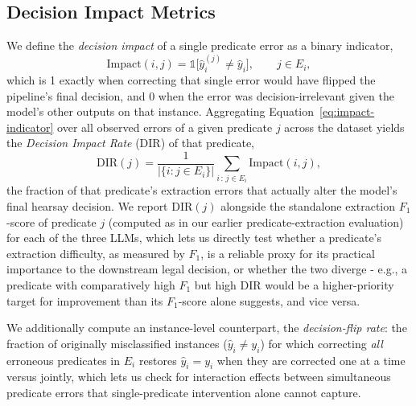 \subsection{Decision Impact Metrics}
\label{subsec:metrics}
We define the \emph{decision impact} of a single predicate error as a binary indicator,
\begin{equation}
\label{eq:impact-indicator}
\mathrm{Impact}(i,j) = \mathbb{1}\big[\hat{y}_i^{(j)} \neq \hat{y}_i\big], \qquad j \in E_i,
\end{equation}
which is 1 exactly when correcting that single error would have flipped the pipeline's final decision, and 0 when the error was decision-irrelevant given the model's other outputs on that instance. Aggregating Equation~\ref{eq:impact-indicator} over all observed errors of a given predicate $j$ across the dataset yields the \emph{Decision Impact Rate} (DIR) of that predicate,
\begin{equation}
\label{eq:dir}
\mathrm{DIR}(j) = \frac{1}{|\{i : j \in E_i\}|} \sum_{i \,:\, j \in E_i} \mathrm{Impact}(i,j),
\end{equation}
the fraction of that predicate's extraction errors that actually alter the model's final hearsay decision. We report $\mathrm{DIR}(j)$ alongside the standalone extraction $F_1$-score of predicate $j$ (computed as in our earlier predicate-extraction evaluation) for each of the three LLMs, which lets us directly test whether a predicate's extraction difficulty, as measured by $F_1$, is a reliable proxy for its practical importance to the downstream legal decision, or whether the two diverge - e.g., a predicate with comparatively high $F_1$ but high DIR would be a higher-priority target for improvement than its $F_1$-score alone suggests, and vice versa.

We additionally compute an instance-level counterpart, the \emph{decision-flip rate}: the fraction of originally misclassified instances ($\hat{y}_i \neq y_i$) for which correcting \emph{all} erroneous predicates in $E_i$ restores $\hat{y}_i = y_i$ when they are corrected one at a time versus jointly, which lets us check for interaction effects between simultaneous predicate errors that single-predicate intervention alone cannot capture.

